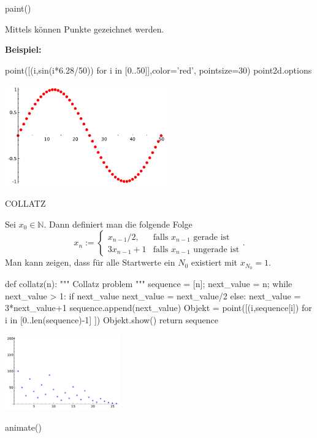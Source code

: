 \documentclass[fontsize=12pt,paper=a4,twoside,bibtotoc,idxtotoc,
liststotoc,pagesize,BCOR1.2cm,DIV15,chapterprefix,pagesize=pdftex]{scrbook}
\theoremstyle{plain}
\theoremstyle{definition}
\theoremstyle{remark}
\begin{document}
paint()

Mittels {\color{blue} } 
können Punkte gezeichnet werden.

\textbf{Beispiel:}
\begin{sagein}
point([(i,sin(i*6.28/50)) for i in [0..50]],color='red', pointsize=30) 
point2d.options
\end{sagein}
\begin{center}
\includegraphics[width=7cm]{point2d.pdf} 
\end{center}

COLLATZ

Sei $x_0\in \mathbb{N}$. Dann definiert man die folgende Folge
\[ x_n:= \left \{ \begin{array}{ll}
 x_{n-1}/2, & \mbox{falls } x_{n-1} \mbox{ gerade ist} \\
3x_{n-1}+1 & \mbox{falls } x_{n-1} \mbox{ ungerade ist} 
\end{array} \right. . \] 
Man kann zeigen, dass für alle Startwerte ein $N_0$ existiert mit $x_{N_0}=1$.

\begin{sagein}
def collatz(n):
    """ Collatz problem """
    sequence = [n]; next_value = n;
    while next_value > 1:
        if next_value %
            next_value = next_value/2
        else:
            next_value = 3*next_value+1
        sequence.append(next_value)
    Objekt = point([(i,sequence[i]) for i in [0..len(sequence)-1] ]) 
    Objekt.show()   
    return sequence
\end{sagein}
\begin{center}
\includegraphics[width=5cm]{collatz.pdf} 
\end{center}

animate()
\end{document}
